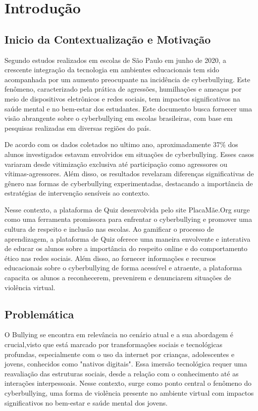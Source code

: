 \chapter{Introdução}


\section{Inicio da Contextualização e Motivação}

Segundo estudos realizados em escolas de São Paulo em junho de 2020, a crescente integração da tecnologia em ambientes educacionais tem sido acompanhada por um aumento preocupante na incidência de cyberbullying. Este fenômeno, caracterizado pela prática de agressões, humilhações e ameaças por meio de dispositivos eletrônicos e redes sociais, tem impactos significativos na saúde mental e no bem-estar dos estudantes. Este documento busca fornecer uma visão abrangente sobre o cyberbullying em escolas brasileiras, com base em pesquisas realizadas em diversas regiões do país.

De acordo com os dados coletados no ultimo ano, aproximadamente 37\% dos alunos investigados estavam envolvidos em situações de cyberbullying. Esses casos variaram desde vitimização exclusiva até participação como agressores ou vítimas-agressores. Além disso, os resultados revelaram diferenças significativas de gênero nas formas de cyberbullying experimentadas, destacando a importância de estratégias de intervenção sensíveis ao contexto.

Nesse contexto, a plataforma de Quiz desenvolvida pelo site PlacaMãe.Org surge como uma ferramenta promissora para enfrentar o cyberbullying e promover uma cultura de respeito e inclusão nas escolas.
Ao gamificar o processo de aprendizagem, a plataforma de Quiz oferece uma maneira envolvente e interativa de educar os alunos sobre a importância do respeito online e do comportamento ético nas redes sociais. Além disso, ao fornecer informações e recursos educacionais sobre o cyberbullying de forma acessível e atraente, a plataforma capacita os alunos a reconhecerem, prevenirem e denunciarem situações de violência virtual.

 

\section{Problemática}
O Bullying se encontra em relevância no cenário atual e a sua abordagem é crucial,visto que está marcado por transformações sociais e tecnológicas profundas, especialmente com o uso da internet por crianças, adolescentes e jovens, conhecidos como "nativos digitais". Essa imersão tecnológica requer uma reavaliação das estruturas sociais, desde a relação com o conhecimento até as interações interpessoais. Nesse contexto, surge como ponto central o fenômeno do cyberbullying, uma forma de violência presente no ambiente virtual com impactos significativos no bem-estar e saúde mental dos jovens.

